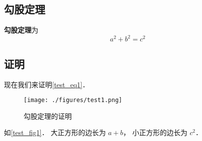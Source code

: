 
\subsection{勾股定理}
\textbf{勾股定理}为
\begin{equation}
a^2 + b^2 = c^2
\end{equation}

\subsection{证明}
现在我们来证明\autoref{test_eq1}．

\begin{figure}[ht]
\centering
\texttt{[image: ./figures/test1.png]}
\caption{勾股定理的证明} \label{test_fig1}
\end{figure}

如\autoref{test_fig1}． 大正方形的边长为 $a + b$， 小正方形的边长为 $c^2$． 